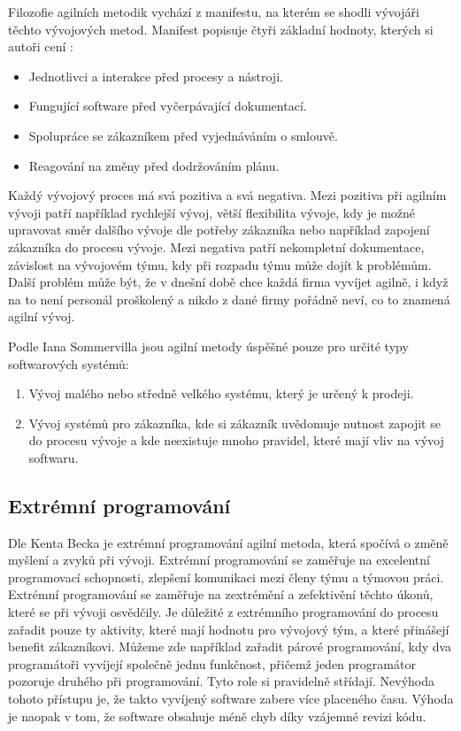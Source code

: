 \documentclass[czech,master]{diploma}
\begin{document}
Filozofie agilních metodik vychází z manifestu, na kterém se shodli vývojáři těchto vývojových metod. Manifest popisuje čtyři základní hodnoty, kterých si autoři cení \cite{ref:agilne_manifesto}:

\begin{itemize}
\item Jednotlivci a interakce před procesy a nástroji.
\item Fungující software před vyčerpávající dokumentací.
\item Spolupráce se zákazníkem před vyjednáváním o smlouvě.
\item Reagování na změny před dodržováním plánu.
\end{itemize}

Každý vývojový proces má svá pozitiva a svá negativa. Mezi pozitiva při agilním vývoji patří například rychlejší vývoj, větší flexibilita vývoje, kdy je možné upravovat směr dalšího vývoje dle potřeby zákazníka nebo například zapojení zákazníka do procesu vývoje. Mezi negativa patří nekompletní dokumentace, závislost na vývojovém týmu, kdy při rozpadu týmu může dojít k problémům. Další problém může být, že v dnešní době chce každá firma vyvíjet agilně, i když na to není personál proškolený a nikdo z dané firmy pořádně neví, co to znamená agilní vývoj.

Podle Iana Sommervilla \cite{ref:sommerrville_agile_products} jsou agilní metody úspěšné pouze pro určité typy softwarových systémů:

\begin{enumerate}
\item Vývoj malého nebo středně velkého systému, který je určený k prodeji.
\item Vývoj systémů pro zákazníka, kde si zákazník uvědomuje nutnost zapojit se do procesu vývoje a kde neexistuje mnoho pravidel, které mají vliv na vývoj softwaru.
\end{enumerate}


\subsection{Extrémní programování}
Dle Kenta Becka \cite{ref:what_is_xp} je extrémní programování agilní metoda, která spočívá o změně myšlení a zvyků při vývoji. Extrémní programování se zaměřuje na excelentní programovací schopnosti, zlepšení komunikaci mezi členy týmu a týmovou práci. Extrémní programování se zaměřuje na zextrémění a zefektivění těchto úkonů, které se při vývoji osvědčily. Je důležité z extrémního programování do procesu zařadit pouze ty aktivity, které mají hodnotu pro vývojový tým, a které přinášejí benefit zákazníkovi. Můžeme zde například zařadit párové programování, kdy dva programátoři vyvíjejí společně jednu funkčnost, přičemž jeden programátor pozoruje druhého při programování. Tyto role si pravidelně střídají. Nevýhoda tohoto přístupu je, že takto vyvíjený software zabere více placeného času. Výhoda je naopak v tom, že software obsahuje méně chyb díky vzájemné revizi kódu.
\end{document}
